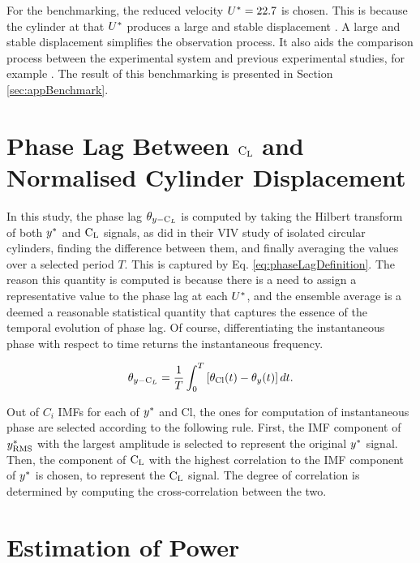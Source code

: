 \documentclass[oneside]{utmthesis}
\begin{document}
For the benchmarking, the reduced velocity $U^{*} = 22.7$ is chosen. This is because the cylinder at that $U^{*}$ produces a large and stable displacement \citep{Koide2013}. A large and stable displacement simplifies the observation process. It also aids the comparison process between the experimental system and previous experimental studies, for example \citet{Koide2013}. The result of this benchmarking is presented in Section \ref{sec:appBenchmark}.

\section{Phase Lag Between $\text{C}_{\text{L}}$ and Normalised Cylinder Displacement} \label{sec:phaseLag90}

\vspace{\baselineskip}

In this study, the phase lag $\theta_{y-\text{C}_{L}}$ is computed by taking the Hilbert transform of both $y^{*}$ and $\text{C}_{\text{L}}$ signals, as \citet{Khalak1999} did in their VIV study of isolated circular cylinders, finding the difference between them, and finally averaging the values over a selected period $T$. This is captured by Eq. \ref{eq:phaseLagDefinition}. The reason this quantity is computed is because there is a need to assign a representative value to the phase lag at each $U^{*}$, and the ensemble average is a deemed a reasonable statistical quantity that captures the essence of the temporal evolution of phase lag. Of course, differentiating the instantaneous phase with respect to time returns the instantaneous frequency.

\begin{equation}
  \theta_{y-\text{C}_{L}} = \frac{1}{T} \int_{0}^{T} \left[ \theta_{\text{Cl}}(t) - \theta_{y}(t) \right] dt.
  \label{eq:phaseLagDefinition}
\end{equation}

Out of $C_{i}$ IMFs for each of $y^{*}$ and Cl, the ones for computation of instantaneous phase are selected according to the following rule. First, the IMF component of $y^{*}_{\text{RMS}}$ with the largest \rms{} amplitude is selected to represent the original $y^{*}$ signal. Then, the component of $\text{C}_{\text{L}}$ with the highest correlation to the IMF component of $y^{*}$ is chosen, to represent the $\text{C}_{\text{L}}$ signal. The degree of correlation is determined by computing the cross-correlation between the two.

\section{Estimation of Power} \label{sec:estimationOfPower}
\end{document}
